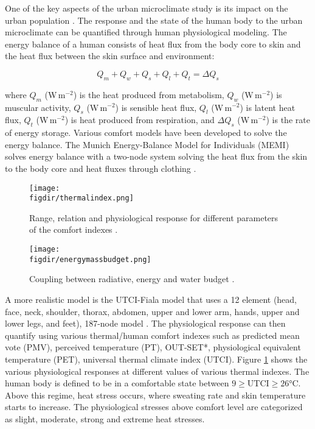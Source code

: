 One of the key aspects of the urban microclimate study is its impact on the urban population \citep{Oke2017a,Saneinejad2013}. The response and the state of the human body to the urban microclimate can be quantified through human physiological modeling. The energy balance of a human consists of heat flux from the body core to skin and the heat flux between the skin surface and environment:

	\begin{equation}
	Q_m + Q_w + Q_s + Q_l + Q_t =  \Delta Q_s
	\end{equation}

where $Q_m$ (W\,m$^{-2}$) is the heat produced from metabolism, $Q_w$ (W\,m$^{-2}$) is muscular activity, $Q_s$ (W\,m$^{-2}$) is sensible heat flux, $Q_l$ (W\,m$^{-2}$) is latent heat flux, $Q_t$ (W\,m$^{-2}$) is heat produced from respiration, and $\Delta Q_s$ (W\,m$^{-2}$) is the rate of energy storage. Various comfort models have been developed to solve the energy balance. The Munich Energy-Balance Model for Individuals (MEMI) solves energy balance with a two-node system solving the heat flux from the skin to the body core and heat fluxes through clothing \citep{Hoppe1999}. 

	\begin{figure}[p]
		\centering
		\texttt{[image: \\figdir/thermalindex.png]}
		\caption{Range, relation and physiological response for different parameters of the comfort indexes \citep{Oke2017a,Matzarakis1999,Bazejczyk2013}.}
		\label{fig:thermalindex}
	\end{figure}
	
	\begin{figure}[p]
	\centering
	\texttt{[image: \\figdir/energymassbudget.png]}
	\caption{Coupling between radiative, energy and water budget \citep{Sawinski2011}.}
	\label{fig:energymassbudget}
	\end{figure}


A more realistic model is the UTCI-Fiala model that uses a 12 element (head, face, neck, shoulder, thorax, abdomen, upper and lower arm, hands, upper and lower legs, and feet), 187-node model \citep{Fiala2001,Brode2012,Blazejczyk2012,Jendritzky2012,Bazejczyk2013,Lokys2015}. The physiological response can then quantify using various thermal/human comfort indexes such as predicted mean vote (PMV), perceived temperature (PT), OUT-SET*, physiological equivalent temperature (PET), universal thermal climate index (UTCI). Figure \ref{fig:thermalindex} shows the various physiological responses at different values of various thermal indexes. The human body is defined to be in a comfortable state between $9\ge \mathrm{UTCI} \ge 26$\si{\celsius}. Above this regime, heat stress occurs, where sweating rate and skin temperature starts to increase. The physiological stresses above comfort level are categorized as slight, moderate, strong and extreme heat stresses.

